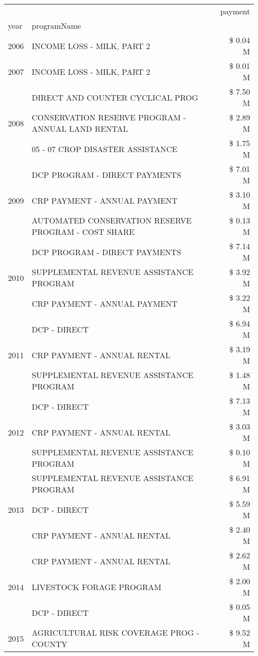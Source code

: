 \begin{tabular}{llr}
\toprule
 &  & payment \\
year & programName &  \\
\midrule
2006 & INCOME LOSS - MILK, PART 2 & \$ 0.04 M \\
\cline{1-3}
2007 & INCOME LOSS - MILK, PART 2 & \$ 0.01 M \\
\cline{1-3}
\multirow[t]{3}{*}{2008} & DIRECT AND COUNTER CYCLICAL PROG & \$ 7.50 M \\
 & CONSERVATION RESERVE PROGRAM - ANNUAL LAND RENTAL & \$ 2.89 M \\
 & 05 - 07 CROP DISASTER ASSISTANCE & \$ 1.75 M \\
\cline{1-3}
\multirow[t]{3}{*}{2009} & DCP PROGRAM - DIRECT PAYMENTS & \$ 7.01 M \\
 & CRP PAYMENT - ANNUAL PAYMENT & \$ 3.10 M \\
 & AUTOMATED CONSERVATION RESERVE PROGRAM - COST SHARE & \$ 0.13 M \\
\cline{1-3}
\multirow[t]{3}{*}{2010} & DCP PROGRAM - DIRECT PAYMENTS & \$ 7.14 M \\
 & SUPPLEMENTAL REVENUE ASSISTANCE PROGRAM & \$ 3.92 M \\
 & CRP PAYMENT - ANNUAL PAYMENT & \$ 3.22 M \\
\cline{1-3}
\multirow[t]{3}{*}{2011} & DCP - DIRECT & \$ 6.94 M \\
 & CRP PAYMENT - ANNUAL RENTAL & \$ 3.19 M \\
 & SUPPLEMENTAL REVENUE ASSISTANCE PROGRAM & \$ 1.48 M \\
\cline{1-3}
\multirow[t]{3}{*}{2012} & DCP - DIRECT & \$ 7.13 M \\
 & CRP PAYMENT - ANNUAL RENTAL & \$ 3.03 M \\
 & SUPPLEMENTAL REVENUE ASSISTANCE PROGRAM & \$ 0.10 M \\
\cline{1-3}
\multirow[t]{3}{*}{2013} & SUPPLEMENTAL REVENUE ASSISTANCE PROGRAM & \$ 6.91 M \\
 & DCP - DIRECT & \$ 5.59 M \\
 & CRP PAYMENT - ANNUAL RENTAL & \$ 2.40 M \\
\cline{1-3}
\multirow[t]{3}{*}{2014} & CRP PAYMENT - ANNUAL RENTAL & \$ 2.62 M \\
 & LIVESTOCK FORAGE PROGRAM & \$ 2.00 M \\
 & DCP - DIRECT & \$ 0.05 M \\
\cline{1-3}
\multirow[t]{3}{*}{2015} & AGRICULTURAL RISK COVERAGE PROG - COUNTY & \$ 9.52 M \\

\end{tabular}
